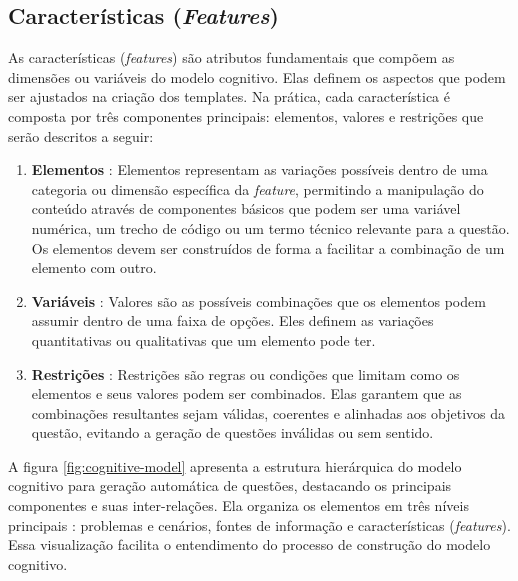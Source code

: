 \subsection{Características (\textit{Features})}

As características (\textit{features}) são atributos fundamentais que compõem as dimensões ou variáveis do modelo cognitivo. Elas definem os aspectos que podem ser ajustados na criação dos templates. Na prática, cada característica é composta por três componentes principais: elementos, valores e restrições que serão descritos a seguir:

\begin{enumerate}
\item \textbf{Elementos} : Elementos representam as variações possíveis dentro de uma categoria ou dimensão específica da \textit{feature}, permitindo a manipulação do conteúdo através de componentes básicos que podem ser uma variável numérica, um trecho de código ou um termo técnico relevante para a questão. Os elementos devem ser construídos de forma a facilitar a combinação de um elemento com outro.

\item \textbf{Variáveis} : Valores são as possíveis combinações que os elementos podem assumir dentro de uma faixa de opções. Eles definem as variações quantitativas ou qualitativas que um elemento pode ter.

\item \textbf{Restrições} : Restrições são regras ou condições que limitam como os elementos e seus valores podem ser combinados. Elas garantem que as combinações resultantes sejam válidas, coerentes e alinhadas aos objetivos da questão, evitando a geração de questões inválidas ou sem sentido.

\end{enumerate}


A figura \ref{fig:cognitive-model} apresenta a estrutura hierárquica do modelo cognitivo para geração automática de questões, destacando os principais componentes e suas inter-relações. Ela organiza os elementos em três níveis principais : problemas e cenários, fontes de informação e características (\textit{features}). Essa visualização facilita o entendimento do processo de construção do modelo cognitivo.

